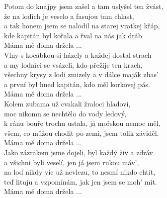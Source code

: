 \begin{multicols}{2}
\singlespacing
\sloka
Potom do knajpy jsem zašel a tam uslyšel ten žvást,\\
že na lodích je veselo a fasujou tam chlast,\\
a tak honem jsem se nalodil na starej vratkej křáp,\\
kde kapitán byl kořala a řval na nás jak dráb. \\

Máma mě doma držela ...\\

Vlny s kocábkou si házely a každej dostal strach\\
a my lodníci se vsázeli, kdo přežije ten krach,\\
všechny krysy z lodi zmizely a v dálce maják zhas'\\
a první byl hned kapitán, kdo měl korkovej pás. \\

Máma mě doma držela ...\\

Kolem zubama už cvakali žraloci hladoví,\\
moc nikomu se nechtělo do vody ledový,\\
k ránu bouře trochu ustala, já mořskou nemoc měl,\\
všem, co můžou chodit po zemi, jsem tolik záviděl. \\

Máma mě doma držela ... \\

Jako zázrakem jsme dojeli, byl každý živ a zdráv\\
a všichni byli veselí, jen já jsem rukou máv',\\
na loď nikdy víc už nevlezu, to nesmí nikdo chtít,\\
teď lituju a vzpomínám, jak jen jsem se moh' mít.\\ 

Máma mě doma držela ... \\
\end{multicols}